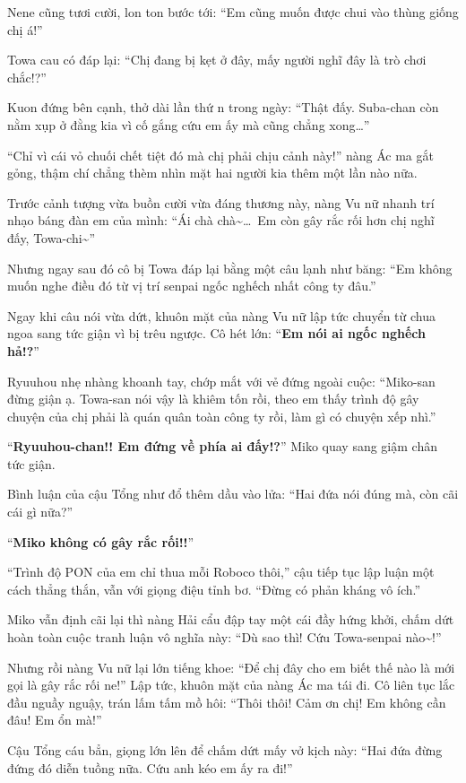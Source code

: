 \documentclass[../main.tex]{subfiles}
\begin{document}
Nene cũng tươi cười, lon ton bước tới: ``Em cũng muốn được chui vào thùng giống chị á!''

Towa cau có đáp lại: ``Chị đang bị kẹt ở đây, mấy người nghĩ đây là trò chơi chắc!?''

Kuon đứng bên cạnh, thở dài lần thứ n trong ngày: ``Thật đấy. Suba-chan còn nằm xụp ở đằng kia vì cố gắng cứu em ấy mà cũng chẳng xong\dots''

``Chỉ vì cái vỏ chuối chết tiệt đó mà chị phải chịu cảnh này!'' nàng Ác ma gắt gỏng, thậm chí chẳng thèm nhìn mặt hai người kia thêm một lần nào nữa.

Trước cảnh tượng vừa buồn cười vừa đáng thương này, nàng Vu nữ nhanh trí nhạo báng đàn em của mình: ``Ái chà chà\~{}\dots\ Em còn gây rắc rối hơn chị nghĩ đấy, Towa-chi\~{}''

Nhưng ngay sau đó cô bị Towa đáp lại bằng một câu lạnh như băng: ``Em không muốn nghe điều đó từ vị trí senpai ngốc nghếch nhất công ty đâu.''

Ngay khi câu nói vừa dứt, khuôn mặt của nàng Vu nữ lập tức chuyển từ chua ngoa sang tức giận vì bị trêu ngược. Cô hét lớn: ``\textbf{Em nói ai ngốc nghếch hả!?}''

Ryuuhou nhẹ nhàng khoanh tay, chớp mắt với vẻ đứng ngoài cuộc: ``Miko-san đừng giận ạ. Towa-san nói vậy là khiêm tốn rồi, theo em thấy trình độ gây chuyện của chị phải là quán quân toàn công ty rồi, làm gì có chuyện xếp nhì.''

``\textbf{Ryuuhou-chan!! Em đứng về phía ai đấy!?}'' Miko quay sang giậm chân tức giận.

Bình luận của cậu Tổng như đổ thêm dầu vào lửa: ``Hai đứa nói đúng mà, còn cãi cái gì nữa?''

``\textbf{Miko không có gây rắc rối!!}''

``Trình độ PON của em chỉ thua mỗi Roboco thôi,'' cậu tiếp tục lập luận một cách thẳng thắn, vẫn với giọng điệu tỉnh bơ. ``Đừng có phản kháng vô ích.''

Miko vẫn định cãi lại thì nàng Hải cẩu đập tay một cái đầy hứng khởi, chấm dứt hoàn toàn cuộc tranh luận vô nghĩa này: ``Dù sao thì! Cứu Towa-senpai nào\~{}!''


Nhưng rồi nàng Vu nữ lại lớn tiếng khoe: ``Để chị đây cho em biết thế nào là mới gọi là gây rắc rối ne!'' Lập tức, khuôn mặt của nàng Ác ma tái đi. Cô liên tục lắc đầu nguầy nguậy, trán lấm tấm mồ hôi: ``Thôi thôi! Cảm ơn chị! Em không cần đâu! Em ổn mà!''

Cậu Tổng cáu bẳn, giọng lớn lên để chấm dứt mấy vở kịch này: ``Hai đứa đừng đứng đó diễn tuồng nữa. Cứu anh kéo em ấy ra đi!''
\end{document}
